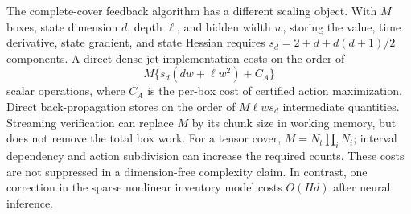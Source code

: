 The complete-cover feedback algorithm has a different scaling object. With $M$ boxes, state dimension $d$, depth $\ell$, and hidden width $w$, storing the value, time derivative, state gradient, and state Hessian requires $s_d=2+d+d(d+1)/2$ components. A direct dense-jet implementation costs on the order of
\[
 M\{s_d(dw+\ell w^2)+C_A\}
\]
scalar operations, where $C_A$ is the per-box cost of certified action maximization. Direct back-propagation stores on the order of $M\ell w s_d$ intermediate quantities. Streaming verification can replace $M$ by its chunk size in working memory, but does not remove the total box work. For a tensor cover, $M=N_t\prod_iN_i$; interval dependency and action subdivision can increase the required counts. These costs are not suppressed in a dimension-free complexity claim. In contrast, one correction in the sparse nonlinear inventory model costs $O(Hd)$ after neural inference.
